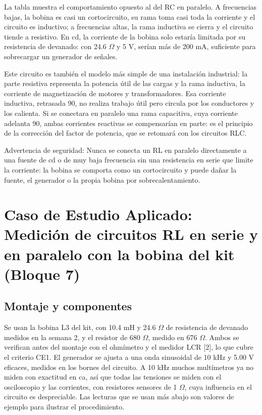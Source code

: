 \documentclass[11pt,letterpaper]{article}
\begin{document}
La tabla muestra el comportamiento opuesto al del RC en paralelo. A frecuencias bajas, la bobina es casi un cortocircuito, su rama toma casi toda la corriente y el circuito es inductivo; a frecuencias altas, la rama inductiva se cierra y el circuito tiende a resistivo. En cd, la corriente de la bobina solo estaría limitada por su resistencia de devanado: con 24.6 \ensuremath{\Omega} y 5 V, serían más de 200 mA, suficiente para sobrecargar un generador de señales.

Este circuito es también el modelo más simple de una instalación industrial: la parte resistiva representa la potencia útil de las cargas y la rama inductiva, la corriente de magnetización de motores y transformadores. Esa corriente inductiva, retrasada 90\textdegree{}, no realiza trabajo útil pero circula por los conductores y los calienta. Si se conectara en paralelo una rama capacitiva, cuya corriente adelanta 90\textdegree{}, ambas corrientes reactivas se compensarían en parte: es el principio de la corrección del factor de potencia, que se retomará con los circuitos RLC.

\begin{nota}{Advertencia de seguridad:}
Nunca se conecta un RL en paralelo directamente a una fuente de cd o de muy baja frecuencia sin una resistencia en serie que limite la corriente: la bobina se comporta como un cortocircuito y puede dañar la fuente, el generador o la propia bobina por sobrecalentamiento.
\end{nota}

\section{Caso de Estudio Aplicado: Medición de circuitos RL en serie y en paralelo con la bobina del kit (Bloque 7)}

\subsection{Montaje y componentes}

Se usan la bobina L3 del kit, con 10.4 mH y 24.6 \ensuremath{\Omega} de resistencia de devanado medidos en la semana 2, y el resistor de 680 \ensuremath{\Omega}, medido en 676 \ensuremath{\Omega}. Ambos se verifican antes del montaje con el ohmímetro y el medidor LCR [2], lo que cubre el criterio CE1. El generador se ajusta a una onda sinusoidal de 10 kHz y 5.00 V eficaces, medidos en los bornes del circuito. A 10 kHz muchos multímetros ya no miden con exactitud en ca, así que todas las tensiones se miden con el osciloscopio y las corrientes, con resistores sensores de 1 \ensuremath{\Omega}, cuya influencia en el circuito es despreciable. Las lecturas que se usan más abajo son valores de ejemplo para ilustrar el procedimiento.
\end{document}
